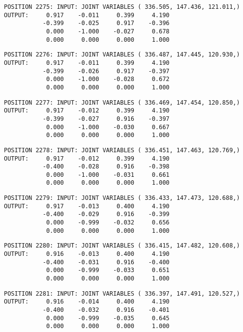\begin{verbatim}
POSITION 2275: INPUT: JOINT VARIABLES ( 336.505, 147.436, 121.011,)
OUTPUT:     0.917    -0.011     0.399     4.190
           -0.399    -0.025     0.917    -0.396
            0.000    -1.000    -0.027     0.678
            0.000     0.000     0.000     1.000
\end{verbatim} \pagebreak[1]\begin{verbatim}
POSITION 2276: INPUT: JOINT VARIABLES ( 336.487, 147.445, 120.930,)
OUTPUT:     0.917    -0.011     0.399     4.190
           -0.399    -0.026     0.917    -0.397
            0.000    -1.000    -0.028     0.672
            0.000     0.000     0.000     1.000
\end{verbatim} \pagebreak[1]\begin{verbatim}
POSITION 2277: INPUT: JOINT VARIABLES ( 336.469, 147.454, 120.850,)
OUTPUT:     0.917    -0.012     0.399     4.190
           -0.399    -0.027     0.916    -0.397
            0.000    -1.000    -0.030     0.667
            0.000     0.000     0.000     1.000
\end{verbatim} \pagebreak[1]\begin{verbatim}
POSITION 2278: INPUT: JOINT VARIABLES ( 336.451, 147.463, 120.769,)
OUTPUT:     0.917    -0.012     0.399     4.190
           -0.400    -0.028     0.916    -0.398
            0.000    -1.000    -0.031     0.661
            0.000     0.000     0.000     1.000
\end{verbatim} \pagebreak[1]\begin{verbatim}
POSITION 2279: INPUT: JOINT VARIABLES ( 336.433, 147.473, 120.688,)
OUTPUT:     0.917    -0.013     0.400     4.190
           -0.400    -0.029     0.916    -0.399
            0.000    -0.999    -0.032     0.656
            0.000     0.000     0.000     1.000
\end{verbatim} \pagebreak[1]\begin{verbatim}
POSITION 2280: INPUT: JOINT VARIABLES ( 336.415, 147.482, 120.608,)
OUTPUT:     0.916    -0.013     0.400     4.190
           -0.400    -0.031     0.916    -0.400
            0.000    -0.999    -0.033     0.651
            0.000     0.000     0.000     1.000
\end{verbatim} \pagebreak[1]\begin{verbatim}
POSITION 2281: INPUT: JOINT VARIABLES ( 336.397, 147.491, 120.527,)
OUTPUT:     0.916    -0.014     0.400     4.190
           -0.400    -0.032     0.916    -0.401
            0.000    -0.999    -0.035     0.645
            0.000     0.000     0.000     1.000
\end{verbatim} \pagebreak[1]\begin{verbatim}

\end{verbatim}
